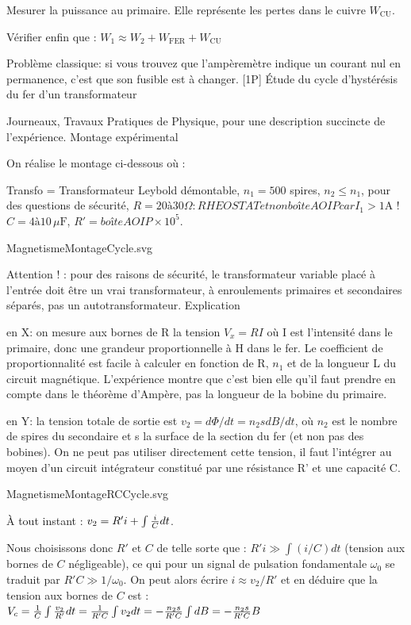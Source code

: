 \documentclass{article}%
\begin{document}
Mesurer la puissance au primaire. Elle représente les pertes dans le cuivre $W_{\mbox{CU}}$.

Vérifier enfin que :
$W_{1} \approx W_2 + W_{\mbox{FER}} + W_{\mbox{CU}}$

Problème classique: si vous trouvez que l'ampèremètre indique un courant nul en permanence, c'est que son fusible est à changer.
[1P] Étude du cycle d'hystérésis du fer d'un transformateur

Journeaux, Travaux Pratiques de Physique, pour une description succincte de l'expérience.
Montage expérimental

On réalise le montage ci-dessous où :

    Transfo = Transformateur Leybold démontable,
    $n_{1 } = 500$ spires,
    $n_{2 } \le n_{1}$, pour des questions de sécurité,
    $R = 20 à 30 \Omega : RHEOSTAT et non boîte AOIP car I_{1} > 1 \textrm{A}$ !
    $C = 4 à 10 \,\mu\textrm{F}$,
   $ R' = boîte AOIP \times 10^{5}$.


MagnetismeMontageCycle.svg

Attention ! : pour des raisons de sécurité, le transformateur variable placé à l'entrée doit être un vrai transformateur, à enroulements primaires et secondaires séparés, pas un autotransformateur.
Explication

    en X: on mesure aux bornes de R la tension $V_{x} = RI$ où I est l'intensité dans le primaire, donc une grandeur proportionnelle à H dans le fer. Le coefficient de proportionnalité est facile à calculer en fonction de R, $n_{1}$ et de la longueur L du circuit magnétique. L'expérience montre que c'est bien elle qu'il faut prendre en compte dans le théorème d'Ampère, pas la longueur de la bobine du primaire.

    en Y: la tension totale de sortie est $v_{2} = d\Phi /dt=n_2 s dB/dt$, où $n_{2}$ est le nombre de spires du secondaire et s la surface de la section du fer (et non pas des bobines). On ne peut pas utiliser directement cette tension, il faut l'intégrer au moyen d'un circuit intégrateur constitué par une résistance R' et une capacité C.

MagnetismeMontageRCCycle.svg

À tout instant :
$ v_{2} = R'i + \int {i\over C} dt$.

Nous choisissons donc $R'$ et $ C$ de telle sorte que : $ R'i \gg \int (i/C) dt$ (tension aux bornes de $ C$ négligeable), ce qui pour un signal de pulsation fondamentale $\omega_0$ se traduit par $ R'C \gg 1/\omega_0$. On peut alors écrire $i \approx v_{2}/R'$ et en déduire que la tension aux bornes de $ C$ est :
$ V_{c} = {1\over C}\int \frac{v_2 }{R'} dt = {1\over R'C} \int v_{2} dt = - \frac{n_2 s}{R'C}\int dB = - \frac{n_2 s}{R'C} B$
\end{document}
